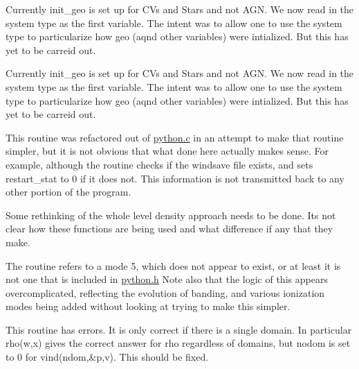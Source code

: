 \begin{DoxyRefList}
\item[\label{bug__bug000054}%
\Hypertarget{bug__bug000054}%
Global \hyperlink{templates_8h_a555f188199cb3346b32e289e64c9d980}{init\+\_\+geo} (void)]Currently init\+\_\+geo is set up for C\+Vs and Stars and not A\+GN. We now read in the system type as the first variable. The intent was to allow one to use the system type to particularize how geo (aqnd other variables) were intialized. But this has yet to be carreid out. 
\item[\label{bug__bug000054}%
\Hypertarget{bug__bug000054}%
Global \hyperlink{templates_8h_a555f188199cb3346b32e289e64c9d980}{init\+\_\+geo} (void)]Currently init\+\_\+geo is set up for C\+Vs and Stars and not A\+GN. We now read in the system type as the first variable. The intent was to allow one to use the system type to particularize how geo (aqnd other variables) were intialized. But this has yet to be carreid out. 
\item[\label{bug__bug000056}%
\Hypertarget{bug__bug000056}%
Global \hyperlink{templates_8h_a3995f2a6ba379027804653e28e4feac1}{init\+\_\+log\+\_\+and\+\_\+windsave} (int restart\+\_\+stat)]This routine was refactored out of \hyperlink{python_8c}{python.\+c} in an attempt to make that routine simpler, but it is not obvious that what done here actually makes sense. For example, although the routine checks if the windsave file exists, and sets restart\+\_\+stat to 0 if it does not. This information is not transmitted back to any other portion of the program. 
\item[\label{bug__bug000035}%
\Hypertarget{bug__bug000035}%
Global \hyperlink{templates_8h_a2ba8dcf484d3688f9687d48dd865dc0d}{levels} (Plasma\+Ptr xplasma, int mode)]Some rethinking of the whole level density approach needs to be done. It\textquotesingle{}s not clear how these functions are being used and what difference if any that they make.  
\item[\label{bug__bug000047}%
\Hypertarget{bug__bug000047}%
Global \hyperlink{templates_8h_a687aa0dcc49f512e562c1e0afddc0263}{mean\+\_\+intensity} (Plasma\+Ptr xplasma, double freq, int mode)]The routine refers to a mode 5, which does not appear to exist, or at least it is not one that is included in \hyperlink{python_8h}{python.\+h} Note also that the logic of this appears overcomplicated, reflecting the evolution of banding, and various ionization modes being added without looking at trying to make this simpler. 
\item[\label{bug__bug000064}%
\Hypertarget{bug__bug000064}%
Global \hyperlink{wind2d_8c_ac98ab21bbcfcfc326f0b16fabd5587c0}{N\+S\+T\+E\+PS} ]This routine has errors. It is only correct if there is a single domain. In particular rho(w,x) gives the correct answer for rho regardless of domains, but nodom is set to 0 for vind(ndom,\&p,v). This should be fixed. 

\end{DoxyRefList}
